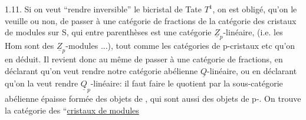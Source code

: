 1.11. Si on veut ``rendre inversible'' le bicristal de Tate $T^1$, on est obligé, qu'on le veuille ou non, de passer à une catégorie de fractions de la catégorie des cristaux de modules sur S, \inserted{[}qui entre parenthèses est une catégorie $\underline Z_p$-linéaire, (i.e. les Hom sont des $\underline Z_p$-modules ...), tout comme les catégories de p-cristaux etc qu'on en déduit\inserted{]}. Il revient donc au même de passer à une catégorie de fractions, en déclarant qu'on veut rendre notre catégorie abélienne $\underline Q$-linéaire, ou en déclarant qu'on la veut rendre $\underline Q_p$-linéaire: il faut faire le quotient par la sous-catégorie abélienne épaisse formée des objets de , qui sont aussi des objets de p-. On trouve la catégorie des ``\uline{cristaux de modules}

